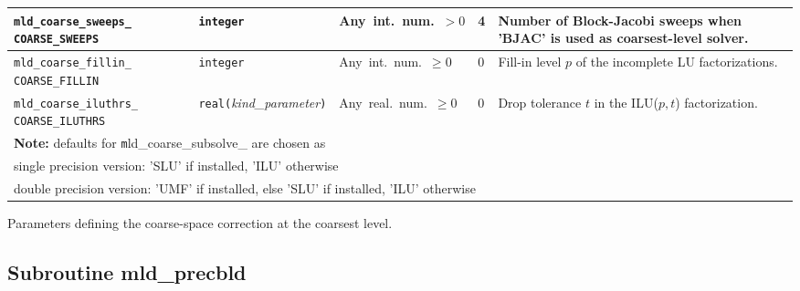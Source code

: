 \begin{center}
\begin{tabular}{|p{3.5cm}|l|p{3.2cm}|l|p{5cm}|}
\verb|mld_coarse_sweeps_| \break \verb|COARSE_SWEEPS| & \verb|integer|                         
                         & Any~int.~num.~$> 0$
                         & 4
                         & Number of Block-Jacobi sweeps when 'BJAC' is used as
                           coarsest-level solver. \\ \hline
\verb|mld_coarse_fillin_| \break \verb|COARSE_FILLIN| & \verb|integer|
                         & Any~int.~num.~$\ge 0$
                         & 0
                         & Fill-in level $p$ of the incomplete LU factorizations. \\ \hline
\verb|mld_coarse_iluthrs_|  \break \verb|COARSE_ILUTHRS| & \verb|real(|\emph{kind\_parameter}\verb|)|
                         & Any~real.~num.~$\ge 0$
                         & 0
                         & Drop tolerance $t$ in the ILU($p,t$) factorization. \\
\hline
\multicolumn{5}{|l|}{{\bfseries Note:} defaults for
  {\texttt mld\_coarse\_subsolve\_} are chosen as }\\ 
\multicolumn{5}{|l|}{single precision version: 'SLU' if installed, 'ILU' otherwise}\\
\multicolumn{5}{|l|}{double precision version: 'UMF' if installed,
  else 'SLU' if installed, 'ILU' otherwise}\\
\hline
\end{tabular}
\end{center}
\caption{Parameters defining the coarse-space correction at the coarsest
level.\label{tab:p_coarse}} 
\esideways



\clearpage

\subsection{Subroutine mld\_precbld\label{sec:precbld}}

